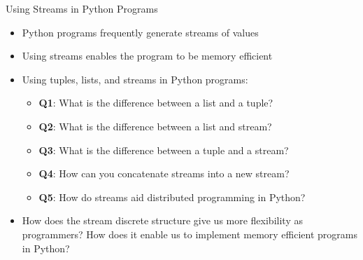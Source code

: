 \documentclass[14pt,aspectratio=169]{beamer}
\begin{document}
%
\begin{frame}{Using Streams in Python Programs}
  \begin{itemize}
    \item Python programs frequently generate streams of values
      \vspace*{-.2in}
    \item Using streams enables the program to be memory efficient
      \vspace*{-.2in}
    \item Using tuples, lists, and streams in Python programs:
      \begin{itemize}
        \item {\bf Q1}: What is the difference between a list and a tuple?
        \item {\bf Q2}: What is the difference between a list and stream?
        \item {\bf Q3}: What is the difference between a tuple and a stream?
        \item {\bf Q4}: How can you concatenate streams into a new stream?
        \item {\bf Q5}: How do streams aid distributed programming in Python?
      \end{itemize}
      \vspace*{-.2in}
    \item How does the stream discrete structure give us more flexibility as
      programmers? How does it enable us to implement memory efficient programs
      in Python?
  \end{itemize}
\end{frame}
\end{document}
